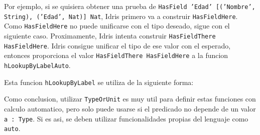 Por ejemplo, si se quisiera obtener una prueba de \texttt{HasField 'Edad' [('Nombre', String), ('Edad', Nat)] Nat}, Idris primero va a construir \texttt{HasFieldHere}. Como \texttt{HasFieldHere} no puede unificarse con el tipo deseado, sigue con el siguiente caso. Proximamente, Idris intenta construir \texttt{HasFieldThere HasFieldHere}. Idris consigue unificar el tipo de ese valor con el esperado, entonces proporciona el valor \texttt{HasFieldThere HasFieldHere} a la funcion \texttt{hLookupByLabelAuto}.

Esta funcion \texttt{hLookupByLabel} se utiliza de la siguiente forma:


Como conclusion, utilizar \texttt{TypeOrUnit} es muy util para definir estas funciones con calculo automatico, pero solo puede usarse si el predicado no depende de un valor \texttt{a : Type}. Si es asi, se deben utilizar funcionalidades propias del lenguaje como \texttt{auto}.
